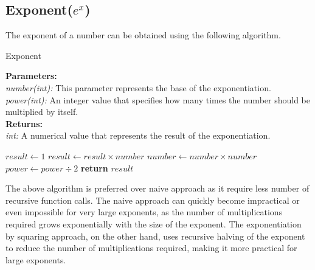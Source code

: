 \subsection{Exponent($e^x$)}
  \begin{flushleft}
    The exponent of a number can be obtained using the following algorithm.
  \end{flushleft}

  \begin{algorithm}
    \caption{Exponent}\label{exp}
      \begin{tabbing}
        \textbf{Parameters:}\\
          \hspace{1em}\textit{number(int):} This parameter represents the base of the exponentiation.\\
          \hspace{1em}\textit{power(int):} An integer value that specifies how many times the number should be multiplied by itself.\\
          
        \textbf{Returns:}\\
          \hspace{1em}\textit{int:}  A numerical value that represents the result of the exponentiation.
      \end{tabbing}
      \vspace{1 em}
    \begin{algorithmic}
          \State $result \gets 1$
                  \State $result \gets result \times number$
              \EndIf
              \State $number \gets number \times number$
              \State $power \gets power \div 2$ 
          \EndWhile
          \State \textbf{return} $result$
      \EndFunction
      \end{algorithmic}
  \end{algorithm}
  \begin{flushleft}
    The above algorithm is preferred over naive approach as it require less number of recursive function calls.
    The naive approach can quickly become impractical or even impossible for very large exponents, as the number of multiplications required grows exponentially with the size of the exponent. The exponentiation by squaring approach, on the other hand, uses recursive halving of the exponent to reduce the number of multiplications required, making it more practical for large exponents.
  \end{flushleft}
\pagebreak